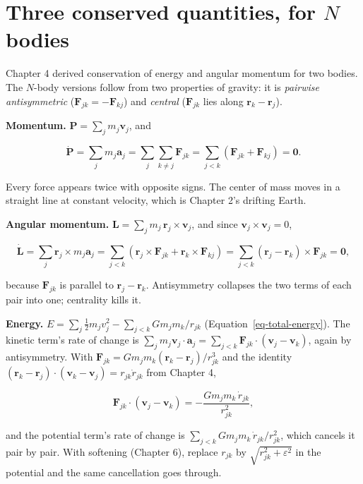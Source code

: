 \documentclass[
  10.5pt,
  letterpaper,
]{scrbook}
\theoremstyle{plain}
\theoremstyle{remark}
\begin{document}
\section{\texorpdfstring{Three conserved quantities, for \(N\)
bodies}{Three conserved quantities, for N bodies}}\label{three-conserved-quantities-for-n-bodies}

Chapter 4 derived conservation of energy and angular momentum for two
bodies. The \(N\)-body versions follow from two properties of gravity:
it is \emph{pairwise antisymmetric}
(\(\mathbf{F}_{jk} = -\mathbf{F}_{kj}\)) and \emph{central}
(\(\mathbf{F}_{jk}\) lies along \(\mathbf{r}_k - \mathbf{r}_j\)).

\textbf{Momentum.} \(\mathbf{P} = \sum_j m_j\mathbf{v}_j\), and

\[
\dot{\mathbf{P}} = \sum_j m_j\mathbf{a}_j = \sum_j\sum_{k\ne j}\mathbf{F}_{jk} = \sum_{j<k}\left(\mathbf{F}_{jk} + \mathbf{F}_{kj}\right) = \mathbf{0}.
\]

Every force appears twice with opposite signs. The center of mass moves
in a straight line at constant velocity, which is Chapter 2's drifting
Earth.

\textbf{Angular momentum.}
\(\mathbf{L} = \sum_j m_j\,\mathbf{r}_j\times\mathbf{v}_j\), and since
\(\mathbf{v}_j\times\mathbf{v}_j = 0\),

\[
\dot{\mathbf{L}} = \sum_j \mathbf{r}_j\times m_j\mathbf{a}_j = \sum_{j<k}\left(\mathbf{r}_j\times\mathbf{F}_{jk} + \mathbf{r}_k\times\mathbf{F}_{kj}\right) = \sum_{j<k}\left(\mathbf{r}_j - \mathbf{r}_k\right)\times\mathbf{F}_{jk} = \mathbf{0},
\]

because \(\mathbf{F}_{jk}\) is parallel to
\(\mathbf{r}_j - \mathbf{r}_k\). Antisymmetry collapses the two terms of
each pair into one; centrality kills it.

\textbf{Energy.}
\(E = \sum_j \tfrac12 m_j v_j^2 - \sum_{j<k} G m_j m_k/r_{jk}\)
(Equation~\ref{eq-total-energy}). The kinetic term's rate of change is
\(\sum_j m_j\mathbf{v}_j\cdot\mathbf{a}_j = \sum_{j<k}\mathbf{F}_{jk}\cdot(\mathbf{v}_j - \mathbf{v}_k)\),
again by antisymmetry. With
\(\mathbf{F}_{jk} = G m_j m_k(\mathbf{r}_k - \mathbf{r}_j)/r_{jk}^3\)
and the identity
\((\mathbf{r}_k - \mathbf{r}_j)\cdot(\mathbf{v}_k - \mathbf{v}_j) = r_{jk}\dot r_{jk}\)
from Chapter 4,

\[
\mathbf{F}_{jk}\cdot(\mathbf{v}_j - \mathbf{v}_k) = -\frac{G m_j m_k\,\dot r_{jk}}{r_{jk}^2},
\]

and the potential term's rate of change is
\(\sum_{j<k} G m_j m_k\,\dot r_{jk}/r_{jk}^2\), which cancels it pair by
pair. With softening (Chapter 6), replace \(r_{jk}\) by
\(\sqrt{r_{jk}^2+\varepsilon^2}\) in the potential and the same
cancellation goes through.
\end{document}

